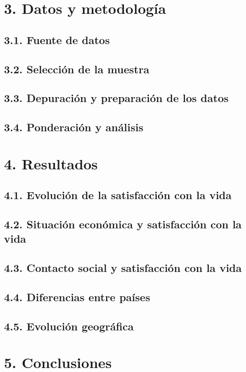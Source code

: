 \documentclass[
]{article}
\begin{document}
\section{3. Datos y metodología}\label{datos-y-metodologuxeda}

\subsection{3.1. Fuente de datos}\label{fuente-de-datos}

\subsection{3.2. Selección de la
muestra}\label{selecciuxf3n-de-la-muestra}

\subsection{3.3. Depuración y preparación de los
datos}\label{depuraciuxf3n-y-preparaciuxf3n-de-los-datos}

\subsection{3.4. Ponderación y
análisis}\label{ponderaciuxf3n-y-anuxe1lisis}

\section{4. Resultados}\label{resultados}

\subsection{4.1. Evolución de la satisfacción con la
vida}\label{evoluciuxf3n-de-la-satisfacciuxf3n-con-la-vida}

\subsection{4.2. Situación económica y satisfacción con la
vida}\label{situaciuxf3n-econuxf3mica-y-satisfacciuxf3n-con-la-vida}

\subsection{4.3. Contacto social y satisfacción con la
vida}\label{contacto-social-y-satisfacciuxf3n-con-la-vida}

\subsection{4.4. Diferencias entre
países}\label{diferencias-entre-pauxedses}

\subsection{4.5. Evolución geográfica}\label{evoluciuxf3n-geogruxe1fica}

\section{5. Conclusiones}\label{conclusiones}
\end{document}
